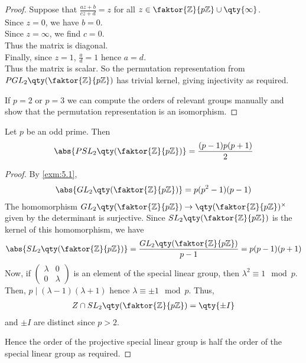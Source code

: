 \begin{proof}
	Suppose that $\frac{az+b}{cz+d} = z$ for all $z \in \faktor{\mathbb Z}{p\mathbb Z} \cup \qty{\infty}$. \\
	Since $z = 0$, we have $b = 0$. \\
	Since $z = \infty$, we find $c = 0$. \\
	Thus the matrix is diagonal. \\
	Finally, since $z = 1$, $\frac{a}{d} = 1$ hence $a = d$. \\
	Thus the matrix is scalar.
	So the permutation representation from $PGL_2\qty(\faktor{\mathbb Z}{p \mathbb Z})$ has trivial kernel, giving injectivity as required.

	If $p = 2$ or $p = 3$ we can compute the orders of relevant groups manually and show that the permutation representation is an isomorphism.
\end{proof}

\begin{lemma}
	Let $p$ be an odd prime.
	Then
	\begin{align*}
		\abs{PSL_2\qty(\faktor{\mathbb Z}{p\mathbb Z})} = \frac{(p-1)p(p+1)}{2}
	\end{align*}
\end{lemma}

\begin{proof}
	By \cref{exm:5.1},
	\begin{align*}
		\abs{GL_2\qty(\faktor{\mathbb Z}{p\mathbb Z})} = p(p^2 - 1)(p - 1)
	\end{align*}
	The homomorphism $GL_2\qty(\faktor{\mathbb Z}{p\mathbb Z}) \to \qty(\faktor{\mathbb Z}{p\mathbb Z})^\times$ given by the determinant is surjective.
	Since $SL_2\qty(\faktor{\mathbb Z}{p\mathbb Z})$ is the kernel of this homomorphism, we have
	\begin{align*}
		\abs{SL_2\qty(\faktor{\mathbb Z}{p\mathbb Z})} = \frac{GL_2\qty(\faktor{\mathbb Z}{p\mathbb Z})}{p - 1} = p(p-1)(p+1)
	\end{align*}
	Now, if $
	\begin{pmatrix}
		\lambda & 0 \\ 0 & \lambda
	\end{pmatrix}
	$ is an element of the special linear group, then $\lambda^2 \equiv 1 \mod p$.
	Then, $p \mid (\lambda - 1)(\lambda + 1)$ hence $\lambda \equiv \pm 1 \mod p$.
	Thus,
	\begin{align*}
		Z \cap SL_2\qty(\faktor{\mathbb Z}{p\mathbb Z}) = \qty{\pm I}
	\end{align*}
	and $\pm I$ are distinct since $p > 2$.

	Hence the order of the projective special linear group is half the order of the special linear group as required.
\end{proof}

